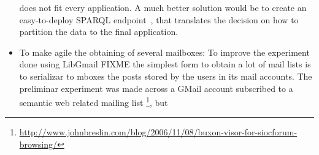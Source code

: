 \documentclass{llncs}
\begin{document}
\begin{itemize}
        does not fit every application. A much better solution would be to
        create an easy-to-deploy SPARQL endpoint~\cite{SPARQL},
        that translates the
        decision on how to partition the data to the final application.
  \item To make agile the obtaining of several mailboxes:
	To improve the experiment done using LibGmail
	FIXME
	the simplest form to obtain a lot of mail lists is to serializar to mboxes 
	the posts stored by the users in its mail accounts. The preliminar experiment 
	was made across a GMail account subscribed to a semantic web related mailing list
	\footnote{\url{http://www.johnbreslin.com/blog/2006/11/08/buxon-visor-for-siocforum-browsing/}},
	but 
\end{itemize}

%



%
\end{document}
